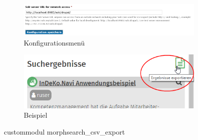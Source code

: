 \begin{figure}[H]
	\centering
	\begin{subfigure}[b]{0.65\textwidth}
		\centering
		\includegraphics[width=\linewidth]{images/config_searchcsv}
		\caption{Konfigurationsmenü}
		\label{fig:config_searchcsv}
	\end{subfigure}
	\begin{subfigure}[b]{0.30\textwidth}
		\centering
		\includegraphics[width=\linewidth]{images/example_searchcsv}
		\caption[]{Beispiel}
		\label{fig:example_searchcsv}
	\end{subfigure}
	\caption{\gls{custommodul} morphsearch\_csv\_export}
	\label{fig:searchcsvexport}
\end{figure}



